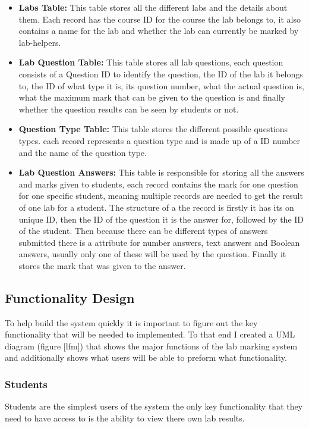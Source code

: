 \documentclass[12pt]{article}  %
\begin{document}
\begin{itemize}
    \item \textbf{Labs Table:} This table stores all the different labs and the details about them. Each record has the course ID for the course the lab belongs to, it also contains a name for the lab and whether the lab can currently be marked by lab-helpers.  
    
    \item \textbf{Lab Question Table:} This table stores all lab questions, each question consists of a Question ID to identify the question, the ID of the lab it belongs to, the ID of what type it is, its question number, what the actual question is, what the maximum mark that can be given to the question is and finally whether the question results can be seen by students or not.
    
    \item \textbf{Question Type Table:} This table stores the different possible questions types. each record represents a question type and is made up of a ID number and the name of the question type.
    
    \item \textbf{Lab Question Answers:} This table is responsible for storing all the answers and marks given to students, each record contains the mark for one question for one specific student, meaning multiple records are needed to get the result of one lab for a student. The structure of a the record is firstly it has its on unique ID, then the ID of the question it is the answer for, followed by the ID of the student. Then because there can be different types of answers submitted there is a attribute for number answers, text answers and Boolean answers, usually only one of these will be used by the question. Finally it stores the mark that was given to the answer.
\end{itemize}


\subsection{Functionality Design}

To help build the system quickly it is important to figure out the key functionality that will be needed to implemented. To that end I created a UML diagram (figure [lfm]) that shows the major functions of the lab marking system and additionally shows what users will be able to preform what functionality.


\subsubsection*{Students}
Students are the simplest users of the system the only key functionality that they need to have access to is the ability to view there own lab results.
\end{document}
